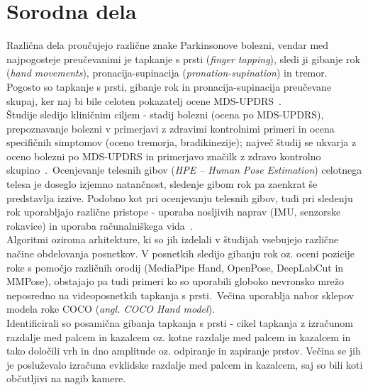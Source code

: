 \documentclass[a4paper,12pt]{article}
\begin{document}
\section{Sorodna dela}
Različna dela proučujejo različne znake Parkinsonove bolezni, vendar med najpogosteje preučevanimi je 
tapkanje s prsti (\textit{finger tapping}), sledi ji gibanje rok (\textit{hand movements}), pronacija-supinacija 
(\textit{pronation-supination}) in tremor. Pogosto so tapkanje s prsti, gibanje rok in pronacija-supinacija 
preučevane skupaj, ker naj bi bile celoten pokazatelj ocene MDS-UPDRS~\cite{Manzanera}. \\

Študije sledijo kliničnim ciljem - stadij bolezni (ocena po MDS-UPDRS), prepoznavanje bolezni v primerjavi z 
zdravimi kontrolnimi primeri in ocena specifičnih simptomov (oceno tremorja, bradikinezije); največ študij 
se ukvarja z oceno bolezni po MDS-UPDRS in primerjavo značilk z zdravo kontrolno skupino~\cite{Amo-Salas}.\
Ocenjevanje telesnih gibov (\textit{HPE – Human Pose Estimation}) celotnega telesa je doseglo izjemno natančnost, 
sledenje gibom rok pa zaenkrat še predstavlja izzive. Podobno kot pri ocenjevanju telesnih gibov, tudi pri 
sledenju rok uporabljajo različne pristope - uporaba nosljivih naprav (IMU, senzorske rokavice) in uporaba 
računalniškega vida~\cite{Amprimoa}. \\

Algoritmi oziroma arhitekture, ki so jih izdelali v študijah vsebujejo različne načine obdelovanja posnetkov. V 
posnetkih sledijo gibanju rok oz. oceni pozicije roke s pomočjo različnih orodij (MediaPipe Hand, OpenPose, 
DeepLabCut in MMPose), obstajajo pa tudi primeri ko so uporabili globoko nevronsko mrežo neposredno na 
videoposnetkih tapkanja s prsti.\
Večina uporablja nabor sklepov modela roke COCO (\textit{angl. COCO Hand model}). \\

Identificirali so posamična gibanja tapkanja s prsti - cikel tapkanja z izračunom razdalje med palcem in 
kazalcem oz. kotne razdalje med palcem in kazalcem in tako določili vrh in dno amplitude oz. odpiranje in 
zapiranje prstov. Večina se jih je posluževalo izračuna evklidske razdalje med palcem in kazalcem, saj so 
bili koti občutljivi na nagib kamere.  \\
\end{document}
